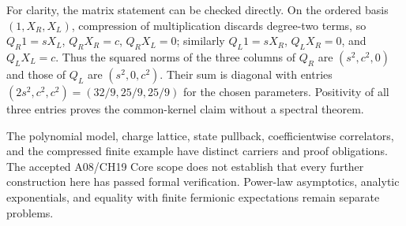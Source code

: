 For clarity, the matrix statement can be checked directly. On the ordered basis
$(1,X_R,X_L)$, compression of multiplication discards degree-two terms, so
$Q_R1=sX_L$, $Q_RX_R=c$, $Q_RX_L=0$; similarly
$Q_L1=sX_R$, $Q_LX_R=0$, and $Q_LX_L=c$. Thus the squared norms of the three
columns of $Q_R$ are $(s^2,c^2,0)$ and those of $Q_L$ are $(s^2,0,c^2)$.
Their sum is diagonal with entries $(2s^2,c^2,c^2)=(32/9,25/9,25/9)$ for the
chosen parameters. Positivity of all three entries proves the common-kernel
claim without a spectral theorem.

\begin{remark}
The polynomial model, charge lattice, state pullback, coefficientwise
correlators, and the compressed finite example have distinct carriers and
proof obligations. The accepted A08/CH19 Core scope does not establish that every
further construction here has passed formal verification. Power-law asymptotics, analytic
exponentials, and equality with finite fermionic expectations remain separate
problems.
\end{remark}
